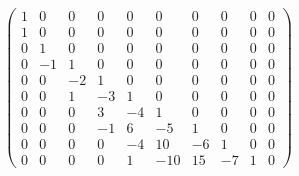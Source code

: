 \begin{displaymath} 
\left(\begin{array}{rrrrrrrrrr}
1 & 0 & 0 & 0 & 0 & 0 & 0 & 0 & 0 & 0 \\
1 & 0 & 0 & 0 & 0 & 0 & 0 & 0 & 0 & 0 \\
0 & 1 & 0 & 0 & 0 & 0 & 0 & 0 & 0 & 0 \\
0 & -1 & 1 & 0 & 0 & 0 & 0 & 0 & 0 & 0 \\
0 & 0 & -2 & 1 & 0 & 0 & 0 & 0 & 0 & 0 \\
0 & 0 & 1 & -3 & 1 & 0 & 0 & 0 & 0 & 0 \\
0 & 0 & 0 & 3 & -4 & 1 & 0 & 0 & 0 & 0 \\
0 & 0 & 0 & -1 & 6 & -5 & 1 & 0 & 0 & 0 \\
0 & 0 & 0 & 0 & -4 & 10 & -6 & 1 & 0 & 0 \\
0 & 0 & 0 & 0 & 1 & -10 & 15 & -7 & 1 & 0
\end{array}\right)
 \end{displaymath}
